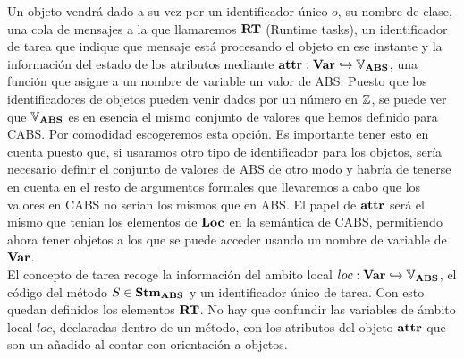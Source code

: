 Un objeto vendrá dado a su vez por un identificador único $o$, su nombre de clase, una cola de mensajes a la que llamaremos $\textbf{RT}$ (Runtime tasks), un identificador de tarea que indique que mensaje está procesando el objeto en ese instante y la información del estado de los atributos mediante $\textbf{attr}: \textbf{Var} \hookrightarrow \mathbb{V}_{\textbf{ABS}}$, una función que asigne a un nombre de variable un valor de ABS. Puesto que los identificadores de objetos pueden venir dados por un número en $\mathbb{Z}$, se puede ver que $\mathbb{V}_{\textbf{ABS}}$ es en esencia el mismo conjunto de valores que hemos definido para CABS. Por comodidad escogeremos esta opción. Es importante tener esto en cuenta puesto que, si usaramos otro tipo de identificador para los objetos, sería necesario definir el conjunto de valores de ABS de otro modo y habría de tenerse en cuenta en el resto de argumentos formales que llevaremos a cabo que los valores en CABS no serían los mismos que en ABS. El papel de $\textbf{attr}$ será el mismo que tenían los elementos de $\textbf{Loc}$ en la semántica de CABS, permitiendo ahora tener objetos a los que se puede acceder usando un nombre de variable de $\textbf{Var}$.\\

El concepto de tarea recoge la información del ambito local $loc: \textbf{Var} \hookrightarrow \mathbb{V}_{\textbf{ABS}}$, el código del método $S \in \textbf{Stm}_{\textbf{ABS}}$ y un identificador único de tarea. Con esto quedan definidos los elementos $\textbf{RT}$. No hay que confundir las variables de ámbito local $loc$, declaradas dentro de un método, con los atributos del objeto $\textbf{attr}$ que son un añadido al contar con orientación a objetos.\\

